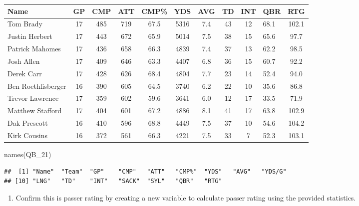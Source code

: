 \documentclass[
  11pt,
]{book}
\newenvironment{Shaded}{\begin{snugshade}}{\end{snugshade}}
\newcommand{\FunctionTok}[1]{\textcolor[rgb]{0.00,0.00,0.00}{#1}}
\newcommand{\NormalTok}[1]{#1}
\providecommand{\tightlist}{%
  \setlength{\itemsep}{0pt}\setlength{\parskip}{0pt}}
\theoremstyle{definition}
\theoremstyle{definition}
\theoremstyle{definition}
\theoremstyle{definition}
\theoremstyle{remark}
\begin{document}
\begin{table}[H]
\centering
\begin{tabular}{l|c|c|c|c|c|c|c|c|l|c}
\hline
Name & GP & CMP & ATT & CMP\% & YDS & AVG & TD & INT & QBR & RTG\\
\hline
Tom Brady & 17 & 485 & 719 & 67.5 & 5316 & 7.4 & 43 & 12 & 68.1 & 102.1\\
\hline
Justin Herbert & 17 & 443 & 672 & 65.9 & 5014 & 7.5 & 38 & 15 & 65.6 & 97.7\\
\hline
Patrick Mahomes & 17 & 436 & 658 & 66.3 & 4839 & 7.4 & 37 & 13 & 62.2 & 98.5\\
\hline
Josh Allen & 17 & 409 & 646 & 63.3 & 4407 & 6.8 & 36 & 15 & 60.7 & 92.2\\
\hline
Derek Carr & 17 & 428 & 626 & 68.4 & 4804 & 7.7 & 23 & 14 & 52.4 & 94.0\\
\hline
Ben Roethlisberger & 16 & 390 & 605 & 64.5 & 3740 & 6.2 & 22 & 10 & 35.6 & 86.8\\
\hline
Trevor Lawrence & 17 & 359 & 602 & 59.6 & 3641 & 6.0 & 12 & 17 & 33.5 & 71.9\\
\hline
Matthew Stafford & 17 & 404 & 601 & 67.2 & 4886 & 8.1 & 41 & 17 & 63.8 & 102.9\\
\hline
Dak Prescott & 16 & 410 & 596 & 68.8 & 4449 & 7.5 & 37 & 10 & 54.6 & 104.2\\
\hline
Kirk Cousins & 16 & 372 & 561 & 66.3 & 4221 & 7.5 & 33 & 7 & 52.3 & 103.1\\
\hline
\end{tabular}
\end{table}

\begin{Shaded}
\begin{Highlighting}[]
\FunctionTok{names}\NormalTok{(QB\_21)}
\end{Highlighting}
\end{Shaded}

\begin{verbatim}
##  [1] "Name"  "Team"  "GP"    "CMP"   "ATT"   "CMP%"  "YDS"   "AVG"   "YDS/G"
## [10] "LNG"   "TD"    "INT"   "SACK"  "SYL"   "QBR"   "RTG"
\end{verbatim}

\begin{enumerate}
\def\labelenumi{(\alph{enumi})}
\tightlist
\item
  Confirm this is passer rating by creating a new variable to calculate passer rating using the provided statistics.
\end{enumerate}
\end{document}

